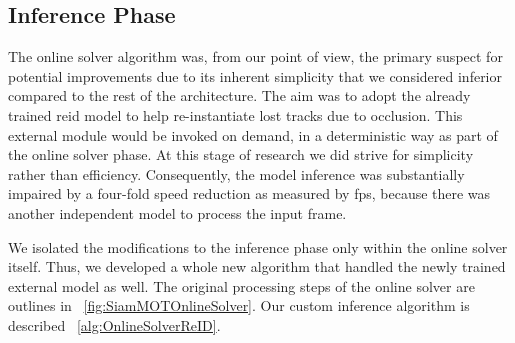 \subsection{Inference Phase}

The online solver algorithm was, from our point of view, the primary suspect for potential improvements due to its inherent simplicity that we considered inferior compared to the rest of the architecture. The aim was to adopt the already trained \gls{reid} model to help re-instantiate lost tracks due to occlusion. This external module would be invoked on demand, in a deterministic way as part of the online solver phase. At this stage of research we did strive for simplicity rather than efficiency. Consequently, the model inference was substantially impaired by a four-fold speed reduction as measured by \gls{fps}, because there was another independent model to process the input frame.

We isolated the modifications to the inference phase only within the online solver itself. Thus, we developed a whole new algorithm that handled the newly trained external model as well. The original processing steps of the online solver are outlines in \figtext{}~\ref{fig:SiamMOTOnlineSolver}. Our custom inference algorithm is described \algtext{}~\ref{alg:OnlineSolverReID}.

